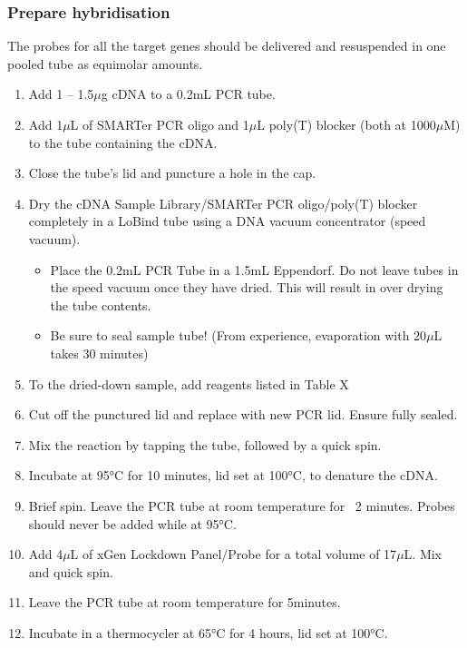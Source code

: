 \subsubsection{Prepare hybridisation}
\label{capture_prephyb}
The probes for all the target genes should be delivered and resuspended in one pooled tube as equimolar amounts. 
\begin{enumerate}
	\item Add 1 – 1.5$\mu$g cDNA to a 0.2mL PCR tube. 
	\item Add 1$\mu$L of SMARTer PCR oligo and 1$\mu$L poly(T) blocker (both at 1000$\mu$M) to the tube containing the cDNA.
	\item Close the tube’s lid and puncture a hole in the cap.
	\item Dry the cDNA Sample Library/SMARTer PCR oligo/poly(T) blocker completely in a LoBind tube using a DNA vacuum concentrator (speed vacuum).
	\begin{itemize}
		\item Place the 0.2mL PCR Tube in a 1.5mL Eppendorf. Do not leave tubes in the speed vacuum once they have dried. This will result in over drying the tube contents.
		\item Be sure to seal sample tube! (From experience, evaporation with 20$\mu$L takes 30 minutes)
	\end{itemize}
	\item To the dried-down sample, add reagents listed in Table X 
	\item Cut off the punctured lid and replace with new PCR lid. Ensure fully sealed.
	\item Mix the reaction by tapping the tube, followed by a quick spin. 
	\item Incubate at 95°C for 10 minutes, lid set at 100°C, to denature the cDNA. 
	\item Brief spin. Leave the PCR tube at room temperature for ~2 minutes. Probes should never be added while at 95°C. 
	\item Add 4$\mu$L of xGen Lockdown Panel/Probe for a total volume of 17$\mu$L. Mix and quick spin. 
	\item Leave the PCR tube at room temperature for 5minutes.
	\item Incubate in a thermocycler at 65°C for 4 hours, lid set at 100°C. 
\end{enumerate} 

